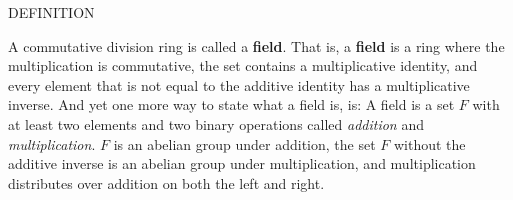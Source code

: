 \documentclass[12pt, a4paper]{article}
\begin{document}
\noindent\blacksquare\rm\hspace{2mm}DEFINITION\par

\vspace{4mm}

A commutative division ring is called a \textbf{field}. That is, a \textbf{field} is a ring where the multiplication is commutative, the set contains a multiplicative identity, and every element that is not equal to the additive identity has a multiplicative inverse. And yet one more way to state what a field is, is: A field is a set $F$ with at least two elements and two binary operations called \textit{addition} and \textit{multiplication}. $F$ is an abelian group under addition, the set $F$ without the additive inverse is an abelian group under multiplication, and multiplication distributes over addition on both the left and right. 
\end{document}
